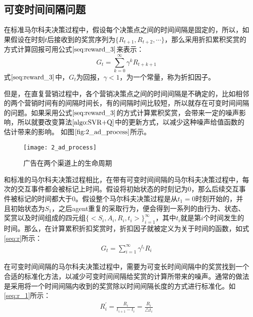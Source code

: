 \subsection{可变时间间隔问题}
在标准马尔科夫决策过程中，假设每个决策点之间的时间间隔是固定的，所以，如果假设在时刻$t$后接收到的奖赏序列为$\{R_{t+1}, R_{t+2},\cdots\}$，那么采用折扣累积奖赏的方式计算回报可用公式$\eqref{seq:reward_3}$来表示：
\begin{equation}\label{seq:reward_3}
G_{t}=\sum_{k=0}^{\infty}\gamma^{k}R_{t+k+1}
\end{equation}
式$\eqref{seq:reward_3}$中，$G_{t}$为回报，$\gamma<1$，为一个常量，称为折扣因子。

但是，在直复营销过程中，各个营销决策点之间的时间间隔是不确定的，比如相邻的两个营销时间有的间隔时间长，有的间隔时间比较短，所以就存在可变时间间隔的问题。如果采用公式$\eqref{seq:reward_3}$的方式计算累积奖赏，会带来一定的噪声影响，所以就要改变算法$\ref{algo:SVR+Q}$中的更新方式，以减少这种噪声给值函数的估计带来的影响。
如图$\ref{fig:2_ad_process}$所示。
\begin{figure}[htbp]
\centering
\texttt{[image: 2\_ad\_process]}
\caption{广告在两个渠道上的生命周期}
\label{fig:2_ad_process}
\end{figure}

和标准的马尔科夫决策过程相比，在带有可变时间间隔的马尔科夫决策过程中，每次的交互事件都会被标记上时间。假设将初始状态的时刻记为$0$，那么后续交互事件被标记的时间都大于0。假设整个马尔科夫决策过程是从$t_{1}=0$时刻开始的，并且初始状态为$S_{1}$，之后agent重复的采取行为，便会得到一系列的由行为、状态、奖赏以及时间组成的四元组$\{<S_{i},A_{i},R_{i},t_{i}>\}_{i=1}^{\infty}$，其中$t_{i}$就是第$i$个时间发生的时间。那么，在计算累积折扣奖赏时，折扣因子就被定义为关于时间的函数，如式\eqref{seq:r}所示：
\begin{equation}\label{seq:r}
\begin{aligned}
G_{t}=\sum_{i=1}^{\infty} \gamma^{t_{i}}R_{i}
\end{aligned}
\end{equation}

在可变时间间隔的马尔科夫决策过程中，需要为可变长时间间隔中的奖赏找到一个合适的标准化方法，以减少可变时间间隔给奖赏的计算所带来的噪声。通常的做法是采用将一个时间间隔内收到的奖赏除以时间间隔长度的方式进行标准化。如\eqref{seq:r_1}所示：
\begin{equation}\label{seq:r_1}
\begin{aligned}
R_{i}^{'}=\frac{R_{i}}{t_{i+1}-t_{i}}=\frac{R_{i}}{\triangle t_{i}}
\end{aligned}
\end{equation}

